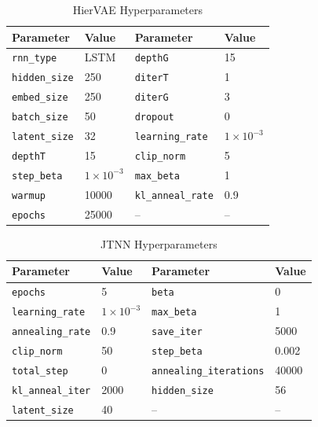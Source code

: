\begin{table}[H]
\centering
\small
\caption{HierVAE Hyperparameters}
\begin{tabular}{ll|ll}
\toprule
Parameter & Value & Parameter & Value \\
\midrule
\texttt{rnn\_type} & LSTM & \texttt{depthG} & 15 \\
\texttt{hidden\_size} & 250 & \texttt{diterT} & 1 \\
\texttt{embed\_size} & 250 & \texttt{diterG} & 3 \\
\texttt{batch\_size} & 50 & \texttt{dropout} & 0 \\
\texttt{latent\_size} & 32 & \texttt{learning\_rate} & $1 \times 10^{-3}$ \\
\texttt{depthT} & 15 & \texttt{clip\_norm} & 5 \\
\texttt{step\_beta} & $1 \times 10^{-3}$ & \texttt{max\_beta} & 1 \\
\texttt{warmup} & 10000 & \texttt{kl\_anneal\_rate} & 0.9 \\
\texttt{epochs} & 25000 & -- & -- \\
\bottomrule
\end{tabular}
\end{table}
\FloatBarrier

\begin{table}[H]
\centering
\small
\caption{JTNN Hyperparameters}
\begin{tabular}{ll|ll}
\toprule
Parameter & Value & Parameter & Value \\
\midrule
\texttt{epochs} & 5 & \texttt{beta} & 0 \\
\texttt{learning\_rate} & $1 \times 10^{-3}$ & \texttt{max\_beta} & 1 \\
\texttt{annealing\_rate} & 0.9 & \texttt{save\_iter} & 5000 \\
\texttt{clip\_norm} & 50 & \texttt{step\_beta} & 0.002 \\
\texttt{total\_step} & 0 & \texttt{annealing\_iterations} & 40000 \\
\texttt{kl\_anneal\_iter} & 2000 & \texttt{hidden\_size} & 56 \\
\texttt{latent\_size} & 40 & -- & -- \\
\bottomrule
\end{tabular}
\end{table}
\FloatBarrier

